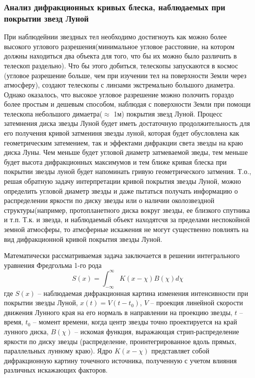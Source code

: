 \documentclass[12pt, a4paper]{article}
\begin{document}
	\subsubsection*{Анализ дифракционных кривых блеска, наблюдаемых при покрытии звезд Луной}
	При наблюдейнии звездных тел необходимо достигноуть как можно более высокого углового разрешения(минимальное угловое расстояние, на котором должны находиться два объекта для того, что бы их можно было различить в телескоп раздельно). Что бы этого добиться, телескопы запускаются в космос (угловое разрешение больше, чем при изучении тел на поверхности Земли через атмосферу), создают телескопы с линзами экстремально большого диаметра. Однако оказалось, что высокое угловое разрешение можно полочить гораздо более простым и дешевым способом, наблюдая с поверхности Земли при помощи телескопа небольшого димаетра($\approx$ 1м) покрытия звезд Луной. Процесс затемнения диска звезды Луной будет иметь достаточную продолжительность для его получения кривой затмениня звезды луной, которая будет обусловлена как геометрическим затемением, так и эффектами дифракции света звезды на краю диска Луны. Чем меньше будет угловой диаметр затмеваемой зведы, тем меньше будет высота дифракционных максимумов и тем ближе кривая блеска при покрытии звезды луной будет напоминать гривую геометрического затмения. Т.о., решая обратную задачу интерпретации кривой покрытия звезды Луной, можно определить угловой диаметр звезды и даже пытаться получать информацию о распределении яркости по диску звезды или о наличии околозвездной структуры(например, протопланетного диска вокруг звезды, ее близкого спутника и т.п. Т.к. и звезда, и наблюдаемый объект находятсчя за пределами неспокойной земной атмосферы, то атмсферные искажения не могут существенно повлиять на вид дифракционной кривой покрытия звезды Луной.  
	
	Математически рассматриваемая задача заключается в решении интегрального уравнения Фредгольма 1-го рода
	$$
	S(x)=\int^{\infty}_{-\infty} K(x-\chi)B(\chi) d\chi
	$$
	где $S(x)$ – наблюдаемая дифракционная картина изменения интенсивности при покрытии звезды Луной, $x(t)=V(t-t_0)$, $V$ – проекция линейной скорости движения Лунного края на его нормаль в направлении на проекцию звезды, $t$ – время, $t_0$ – момент времени, когда центр звезды точно проектируется на край лунного диска, $B(\chi)$ – искомая функция, выражающая стрип-распределение яркости по диску звезды (распределение, проинтегрированное вдоль прямых, параллельных лунному краю). Ядро $K(x-\chi)$ представляет собой дифракционную картину точечного источника, полученную с учетом влияния различных искажающих факторов.
	
\end{document}
